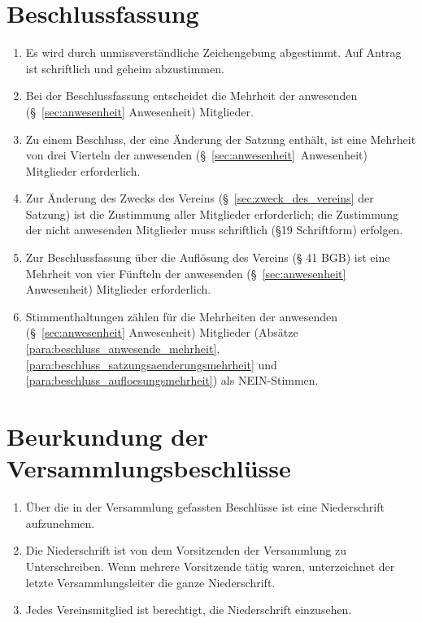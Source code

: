 \documentclass[a4paper]{article}
\begin{document}
\section{Beschlussfassung}\label{sec:beschlussfassung}

\begin{enumerate}
\item Es wird durch unmissverständliche Zeichengebung abgestimmt. Auf Antrag ist schriftlich und geheim abzustimmen.\label{para:beschluss_zeichen}
\item Bei der Beschlussfassung entscheidet die Mehrheit der anwesenden (§~\ref{sec:anwesenheit} Anwesenheit) Mitglieder.\label{para:beschluss_anwesende_mehrheit}
\item Zu einem Beschluss, der eine Änderung der Satzung enthält, ist eine Mehrheit von drei Vierteln der anwesenden (§~\ref{sec:anwesenheit}~Anwesenheit) Mitglieder erforderlich.\label{para:beschluss_satzungsaenderungsmehrheit}
\item Zur Änderung des Zwecks des Vereins (§~\ref{sec:zweck_des_vereins} der Satzung) ist die Zustimmung aller Mitglieder erforderlich; die Zustimmung der nicht anwesenden Mitglieder muss schriftlich (§19 Schriftform) erfolgen.\label{para:beschluss_zweckaenderungsmehrheit}
\item Zur Beschlussfassung über die Auflösung des Vereins (§ 41 BGB) ist eine Mehrheit von vier Fünfteln der anwesenden (§~\ref{sec:anwesenheit} Anwesenheit) Mitglieder erforderlich.\label{para:beschluss_aufloesungsmehrheit}
\item Stimmenthaltungen zählen für die Mehrheiten der anwesenden (§~\ref{sec:anwesenheit} Anwesenheit) Mitglieder (Absätze \ref{para:beschluss_anwesende_mehrheit}, \ref{para:beschluss_satzungsaenderungsmehrheit} und \ref{para:beschluss_aufloesungsmehrheit}) als NEIN-Stimmen.
\end{enumerate}


\section{Beurkundung der Versammlungsbeschlüsse}\label{sec:beurkundung_der_versammlungsbeschluesse}

\begin{enumerate}
\item Über die in der Versammlung gefassten Beschlüsse ist eine Niederschrift aufzunehmen.
\item Die Niederschrift ist von dem Vorsitzenden der Versammlung zu Unterschreiben. Wenn mehrere Vorsitzende tätig waren, unterzeichnet der letzte Versammlungsleiter die ganze Niederschrift.
\item Jedes Vereinsmitglied ist berechtigt, die Niederschrift einzusehen.

\end{enumerate}
\end{document}
